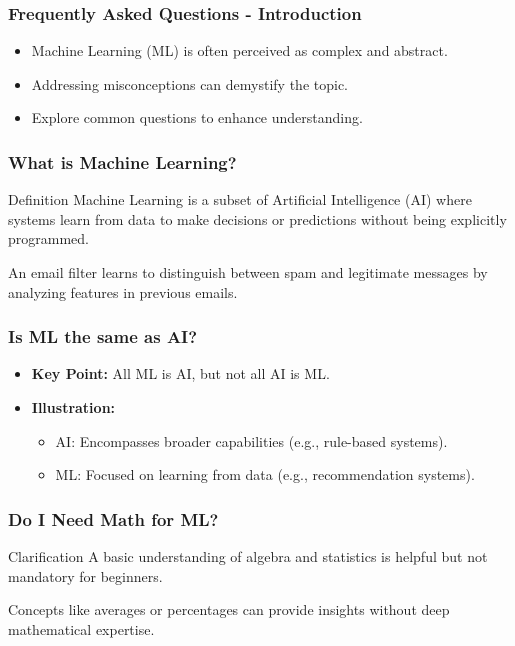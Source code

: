 \documentclass[aspectratio=169]{beamer}
\begin{document}
\begin{frame}[fragile]
    \frametitle{Frequently Asked Questions - Introduction}
    \begin{itemize}
        \item Machine Learning (ML) is often perceived as complex and abstract.
        \item Addressing misconceptions can demystify the topic.
        \item Explore common questions to enhance understanding.
    \end{itemize}
\end{frame}

\begin{frame}[fragile]
    \frametitle{What is Machine Learning?}
    \begin{block}{Definition}
        Machine Learning is a subset of Artificial Intelligence (AI) where systems learn from data to make decisions or predictions without being explicitly programmed.
    \end{block}
    \begin{example}
        An email filter learns to distinguish between spam and legitimate messages by analyzing features in previous emails.
    \end{example}
\end{frame}

\begin{frame}[fragile]
    \frametitle{Is ML the same as AI?}
    \begin{itemize}
        \item \textbf{Key Point:} All ML is AI, but not all AI is ML.
        \item \textbf{Illustration:}
        \begin{itemize}
            \item AI: Encompasses broader capabilities (e.g., rule-based systems).
            \item ML: Focused on learning from data (e.g., recommendation systems).
        \end{itemize}
    \end{itemize}
\end{frame}

\begin{frame}[fragile]
    \frametitle{Do I Need Math for ML?}
    \begin{block}{Clarification}
        A basic understanding of algebra and statistics is helpful but not mandatory for beginners.
    \end{block}
    \begin{example}
        Concepts like averages or percentages can provide insights without deep mathematical expertise.
    \end{example}
\end{frame}
\end{document}
